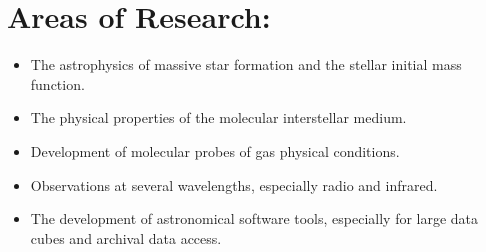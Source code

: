 \section*{Areas of Research: }
\begin{itemize}
    \item The astrophysics of massive star formation and the stellar initial mass function.
    \item The physical properties of the molecular interstellar medium.
    \item Development of molecular probes of gas physical conditions. 
    \item Observations at several wavelengths, especially radio and infrared.
    \item The development of astronomical software tools, especially for large
        data cubes and archival data access.
\end{itemize}

